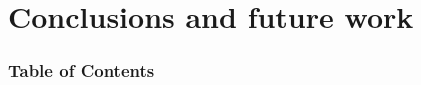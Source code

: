 \section{Conclusions and future work}
\begin{frame}
  \frametitle{Table of Contents}
  \tableofcontents[currentsection]
\end{frame}



%


